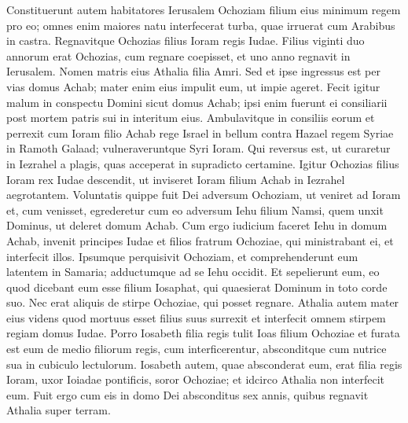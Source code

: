 \begin{biblechapter}  
\verse Constituerunt autem habitatores Ierusalem Ochoziam filium eius minimum regem pro eo; omnes enim maiores natu interfecerat turba, quae irruerat cum Arabibus in castra. Regnavitque Ochozias filius Ioram regis Iudae. 
\verse Filius viginti duo annorum erat Ochozias, cum regnare coepisset, et uno anno regnavit in Ierusalem. Nomen matris eius Athalia filia Amri. 
\verse Sed et ipse ingressus est per vias domus Achab; mater enim eius impulit eum, ut impie ageret. 
\verse Fecit igitur malum in conspectu Domini sicut domus Achab; ipsi enim fuerunt ei consiliarii post mortem patris sui in interitum eius. 
\verse Ambulavitque in consiliis eorum et perrexit cum Ioram filio Achab rege Israel in bellum contra Hazael regem Syriae in Ramoth Galaad; vulneraveruntque Syri Ioram. 
\verse Qui reversus est, ut curaretur in Iezrahel a plagis, quas acceperat in supradicto certamine. Igitur Ochozias filius Ioram rex Iudae descendit, ut inviseret Ioram filium Achab in Iezrahel aegrotantem. 
\verse Voluntatis quippe fuit Dei adversum Ochoziam, ut veniret ad Ioram et, cum venisset, egrederetur cum eo adversum Iehu filium Namsi, quem unxit Dominus, ut deleret domum Achab. 
\verse Cum ergo iudicium faceret Iehu in domum Achab, invenit principes Iudae et filios fratrum Ochoziae, qui ministrabant ei, et interfecit illos. 
\verse Ipsumque perquisivit Ochoziam, et comprehenderunt eum latentem in Samaria; adductumque ad se Iehu occidit. Et sepelierunt eum, eo quod dicebant eum esse filium Iosaphat, qui quaesierat Dominum in toto corde suo. Nec erat aliquis de stirpe Ochoziae, qui posset regnare. 
\verse Athalia autem mater eius videns quod mortuus esset filius suus surrexit et interfecit omnem stirpem regiam domus Iudae. 
\verse Porro Iosabeth filia regis tulit Ioas filium Ochoziae et furata est eum de medio filiorum regis, cum interficerentur, absconditque cum nutrice sua in cubiculo lectulorum. Iosabeth autem, quae absconderat eum, erat filia regis Ioram, uxor Ioiadae pontificis, soror Ochoziae; et idcirco Athalia non interfecit eum. 
\verse Fuit ergo cum eis in domo Dei absconditus sex annis, quibus regnavit Athalia super terram. 
\end{biblechapter}

